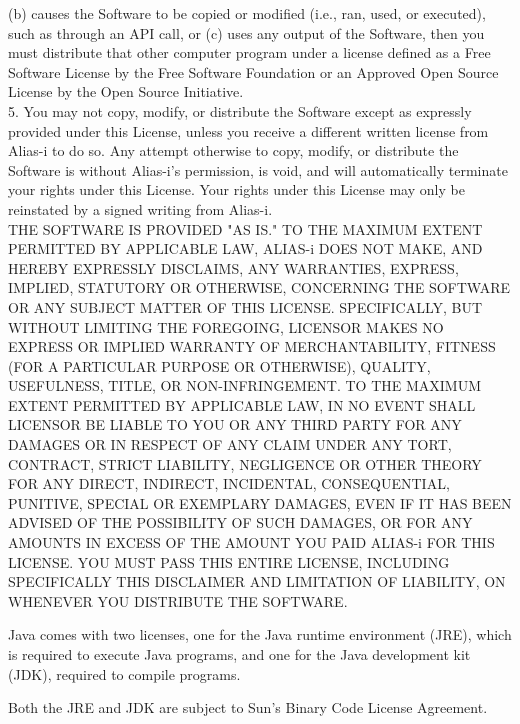 {(b) causes the Software to be copied or modified (i.e., ran, used, or
executed), such as through an API call, or (c) uses any output of the
Software, then you must distribute that other computer program under a
license defined as a Free Software License by the Free Software
Foundation or an Approved Open Source License by the Open Source
Initiative.
\\[8pt]
5. You may not copy, modify, or distribute the Software except as
expressly provided under this License, unless you receive a different
written license from Alias-i to do so.  Any attempt otherwise to copy,
modify, or distribute the Software is without Alias-i's permission, is
void, and will automatically terminate your rights under this License.
Your rights under this License may only be reinstated by a signed
writing from Alias-i.
\\[8pt]
THE SOFTWARE IS PROVIDED "AS IS." TO THE MAXIMUM EXTENT PERMITTED BY
APPLICABLE LAW, ALIAS-i DOES NOT MAKE, AND HEREBY EXPRESSLY DISCLAIMS,
ANY WARRANTIES, EXPRESS, IMPLIED, STATUTORY OR OTHERWISE, CONCERNING
THE SOFTWARE OR ANY SUBJECT MATTER OF THIS LICENSE.  SPECIFICALLY, BUT
WITHOUT LIMITING THE FOREGOING, LICENSOR MAKES NO EXPRESS OR IMPLIED
WARRANTY OF MERCHANTABILITY, FITNESS (FOR A PARTICULAR PURPOSE OR
OTHERWISE), QUALITY, USEFULNESS, TITLE, OR NON-INFRINGEMENT.  TO THE
MAXIMUM EXTENT PERMITTED BY APPLICABLE LAW, IN NO EVENT SHALL LICENSOR
BE LIABLE TO YOU OR ANY THIRD PARTY FOR ANY DAMAGES OR IN RESPECT OF
ANY CLAIM UNDER ANY TORT, CONTRACT, STRICT LIABILITY, NEGLIGENCE OR
OTHER THEORY FOR ANY DIRECT, INDIRECT, INCIDENTAL, CONSEQUENTIAL,
PUNITIVE, SPECIAL OR EXEMPLARY DAMAGES, EVEN IF IT HAS BEEN ADVISED OF
THE POSSIBILITY OF SUCH DAMAGES, OR FOR ANY AMOUNTS IN EXCESS OF THE
AMOUNT YOU PAID ALIAS-i FOR THIS LICENSE.  YOU MUST PASS THIS ENTIRE
LICENSE, INCLUDING SPECIFICALLY THIS DISCLAIMER AND LIMITATION OF
LIABILITY, ON WHENEVER YOU DISTRIBUTE THE SOFTWARE.
}




\setlength{\baselineskip}{\oldbaselineskip}
\noindent
Java comes with two licenses, one for the Java runtime environment
(JRE), which is required to execute Java programs, and one for the
Java development kit (JDK), required to compile programs.


\noindent
Both the JRE and JDK are subject to Sun's Binary Code License Agreement.
\\

